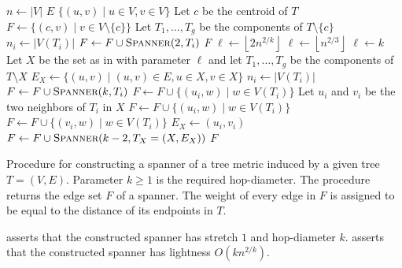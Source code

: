 \documentclass[11pt,english]{article}
\newcommand{\floor}[1]{\ensuremath{\left\lfloor#1\right\rfloor}}
\begin{document}
\begin{algorithm}[!ht]
\begin{algorithmic}[1]
\State $n \gets |V|$
\State\Return $E$
\EndIf
{}
\State\Return $\{(u, v) \mid u \in V, v \in V\}$  
\EndIf
{}
\State Let $c$ be the centroid of $T$
\State $F \gets \{(c, v) \mid v \in V \setminus \{c\} \}$ 
\State Let $T_1,  \ldots, T_g$ be the components of $T \setminus \{c\}$
\State $n_i \gets |V(T_i)|$
\State $F\gets F \cup \Call{Spanner}{2, T_i}$
\EndFor 
\State\Return $F$
\EndIf
\State $\ell \gets \floor{2n^{2/k}}$
 $\ell \gets \floor{n^{2/3}}$
\EndIf
{} $\ell \gets k$
\EndIf
\State Let $X$ be the set as in  with parameter $\ell$ and let $T_1, \ldots, T_g$ be the components of $T \setminus X$
\State $E_X \gets \{ (u,v) \mid (u,v) \in E, u \in X, v \in X\}$ \label{lin:ex-1}
\State $n_i \gets |V(T_i)|$
\State $F \gets F \cup \Call{Spanner}{k, T_i}$
  $F \gets F \cup \{(u_i, w) \mid w \in V(T_i)\}$
\Else
\State Let $u_i$ and $v_i$ be the two neighbors of $T_i$ in $X$
\State $F \gets F \cup \{(u_i, w) \mid w \in V(T_i)\}$
\State $F \gets F \cup \{(v_i, w) \mid w \in V(T_i)\}$
\State $E_X \gets (u_i, v_i)$ \label{lin:ex-2}
\EndIf
\EndFor
\State $F \gets F \cup  \Call{Spanner}{k-2, T_X = (X, E_X)}$
\State\Return $F$
\EndProcedure
\end{algorithmic}
\caption{Procedure for constructing a spanner of a tree metric induced by a given tree $T= (V,E)$. Parameter $k\ge 1$ is the required hop-diameter. The procedure returns the edge set $F$ of a spanner. The weight of every edge in $F$ is assigned to be equal to the distance of its endpoints in $T$.}\label{alg:ub}
\end{algorithm}




 asserts that the constructed spanner has stretch $1$ and hop-diameter $k$.  asserts that the constructed spanner has lightness $O(kn^{2/k})$.
\end{document}
